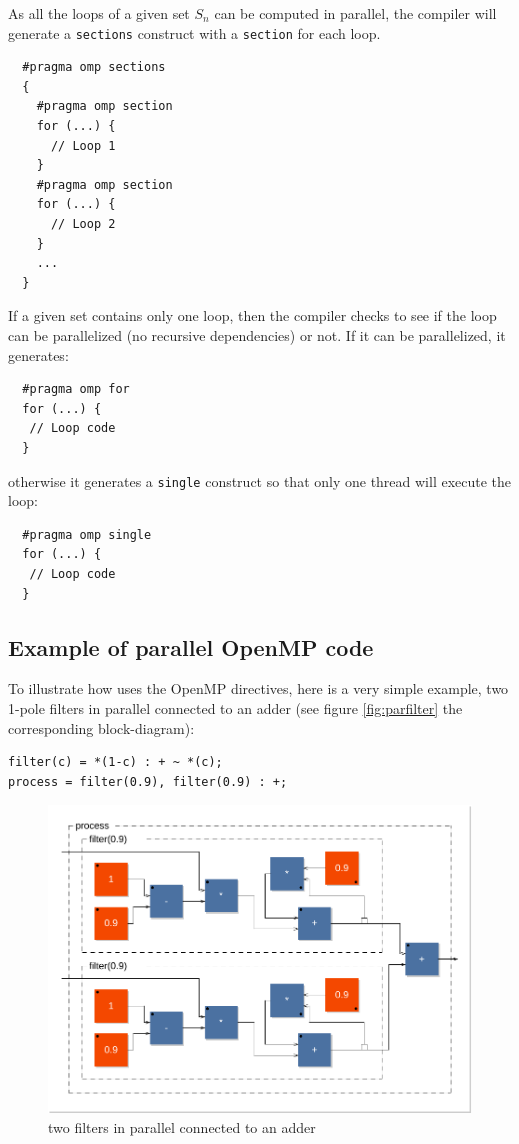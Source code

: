 As all the loops of a given set $S_n$ can be computed in parallel, the compiler will generate a \lstinline!sections! construct with a \lstinline!section! for each loop. 
\begin{lstlisting}
  #pragma omp sections
  {
    #pragma omp section
    for (...) {
      // Loop 1
    }
    #pragma omp section
    for (...) {
      // Loop 2
    }
    ...
  }
\end{lstlisting}
 
If a given set contains only one loop, then the compiler checks to see if the loop can be parallelized (no recursive dependencies) or not. If it can be parallelized, it generates:
\begin{lstlisting}
  #pragma omp for
  for (...) {
   // Loop code
  }
\end{lstlisting}
otherwise it generates a \lstinline!single! construct so that only one thread will execute the loop:
\begin{lstlisting}
  #pragma omp single
  for (...) {
   // Loop code
  }
\end{lstlisting}

\subsection{Example of parallel OpenMP code}
To illustrate how \faust uses the OpenMP directives, here is a very simple example, two 1-pole filters in parallel connected to an adder (see figure \ref{fig:parfilter} the corresponding block-diagram):

\begin{lstlisting}
filter(c) = *(1-c) : + ~ *(c);
process = filter(0.9), filter(0.9) : +; 
\end{lstlisting}

\label{fig:parfilter}
\begin{figure}[htb] 
  \centering
  \includegraphics[scale=0.6]{images/filter2}
  \caption{two filters in parallel connected to an adder}   
\end{figure}


